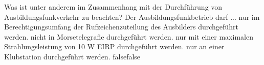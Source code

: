     {Was ist unter anderem im Zusammenhang mit der Durchführung von Ausbildungsfunkverkehr zu beachten? Der Ausbildungsfunkbetrieb darf ...}
    {nur im Berechtigungsumfang der Rufzeichenzuteilung des Ausbilders durchgeführt werden.}
    {nicht in Morsetelegrafie durchgeführt werden.}
    {nur mit einer maximalen Strahlungsleistung von 10 W EIRP durchgeführt werden.}
    {nur an einer Klubstation durchgeführt werden.}
    {false}{false}